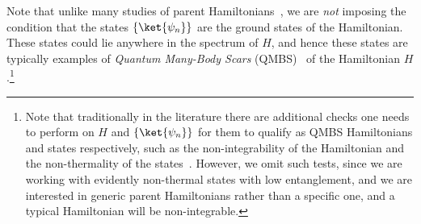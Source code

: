 \documentclass[prx,letterpaper,aps,superscriptaddress,floatfix,twocolumn,nofootinbib]{revtex4-2}
\theoremstyle{definition}
\begin{document}
%
Note that unlike many studies of parent Hamiltonians~\cite{FannesNachtergaeleWerner1992,Perez-Garcia2007,RevModPhys.93.045003,PerezGarciaVerstraeteCiracWolf2008}, we are \textit{not} imposing the condition that the states $\{\ket{\psi_{n}}\}$ are the ground states of the Hamiltonian.
%
These states could lie anywhere in the spectrum of $H$, and hence these states are typically examples of \textit{Quantum Many-Body Scars} (QMBS)~\cite{Bernien_2017, Turner_2018weak, Turner_2018quantum, Khemani_2019, Moudgalya_2018exact, Moudgalya_2018entanglement, Lin_2019, Surace_2020, Iadecola_2019, Ivanov_2025exact, Serbyn_2021, Moudgalya_2022, Papic_2022, Chandran_2023} of the Hamiltonian $H$.\footnote{Note that traditionally in the literature there are additional checks one needs to perform on $H$ and $\{\ket{\psi_{n}}\}$ for them to qualify as QMBS Hamiltonians and states respectively, such as the non-integrability of the Hamiltonian and the non-thermality of the states~\cite{Serbyn_2021, Moudgalya_2022, Papic_2022, Chandran_2023}.
%
However, we omit such tests, since we are working with evidently non-thermal states with low entanglement, and we are interested in generic parent Hamiltonians rather than a specific one, and a typical Hamiltonian will be non-integrable.}
%

%
\end{document}
